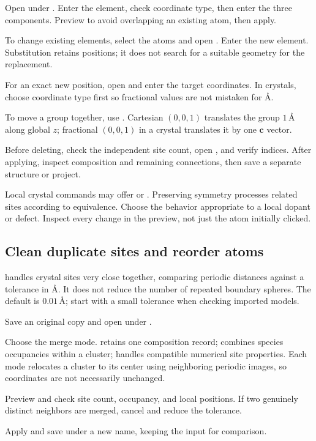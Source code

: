 \begin{steps}
  \item Open  under . Enter the element, check coordinate type, then enter the three components. Preview to avoid overlapping an existing atom, then apply.
  \item To change existing elements, select the atoms and open . Enter the new element. Substitution retains positions; it does not search for a suitable geometry for the replacement.
  \item For an exact new position, open  and enter the target coordinates. In crystals, choose coordinate type first so fractional values are not mistaken for \AA.
  \item To move a group together, use . Cartesian \((0,0,1)\) translates the group $1\,\text{\AA}$ along global $z$; fractional \((0,0,1)\) in a crystal translates it by one $\mathbf c$ vector.
  \item Before deleting, check the independent site count, open , and verify indices. After applying, inspect composition and remaining connections, then save a separate structure or project.
\end{steps}

Local crystal commands may offer  or . Preserving symmetry processes related sites according to equivalence. Choose the behavior appropriate to a local dopant or defect. Inspect every change in the preview, not just the atom initially clicked.

\subsection{Clean duplicate sites and reorder atoms}\label{sec:atom-clean-reference}

 handles crystal sites very close together, comparing periodic distances against a tolerance in \AA. It does not reduce the number of repeated boundary spheres. The default is $0.01\,\text{\AA}$; start with a small tolerance when checking imported models.

\begin{steps}
  \item Save an original copy and open  under .
  \item Choose the merge mode.  retains one composition record;  combines species occupancies within a cluster;  handles compatible numerical site properties. Each mode relocates a cluster to its center using neighboring periodic images, so coordinates are not necessarily unchanged.
  \item Preview and check site count, occupancy, and local positions. If two genuinely distinct neighbors are merged, cancel and reduce the tolerance.
  \item Apply and save under a new name, keeping the input for comparison.
\end{steps}

